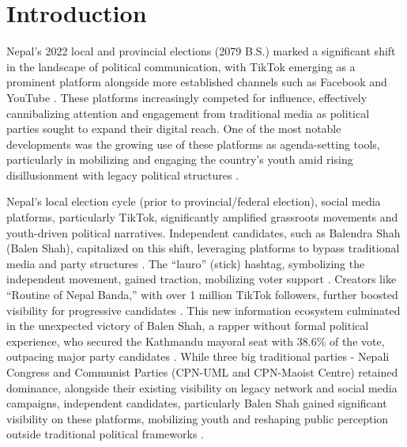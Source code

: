 \documentclass[12pt,a4paper]{report}
\begin{document}
\chapter{Introduction}
Nepal’s 2022 local and provincial elections (2079 B.S.) marked a significant shift in the landscape of political communication, with TikTok emerging as a prominent platform alongside more established channels such as Facebook and YouTube \parencite{nepalitimes2025}. These platforms increasingly competed for influence, effectively cannibalizing attention and engagement from traditional media as political parties sought to expand their digital reach. One of the most notable developments was the growing use of these platforms as agenda-setting tools, particularly in mobilizing and engaging the country’s youth amid rising disillusionment with legacy political structures \parencite{FPExplainers2024, dahal2023influence}.

Nepal's local election cycle (prior to provincial/federal election), social media platforms, particularly TikTok, significantly amplified grassroots movements and youth-driven political narratives. Independent candidates, such as Balendra Shah (Balen Shah), capitalized on this shift, leveraging platforms to bypass traditional media and party structures \parencite{DW2022NepalElections}. The ``lauro'' (stick) hashtag, symbolizing the independent movement, gained traction, mobilizing voter support \parencite{AnnapurnaExpress2022}. Creators like ``Routine of Nepal Banda,'' with over 1 million TikTok followers, further boosted visibility for progressive candidates \parencite{dahal2023influence}. This new information ecosystem culminated in the unexpected victory of Balen Shah, a rapper without formal political experience, who secured the Kathmandu mayoral seat with 38.6\% of the vote, outpacing major party candidates \parencite{wikipedia2022local}. While three big traditional parties - Nepali Congress and Communist Parties (CPN-UML and CPN-Maoist Centre) retained dominance, alongside their existing visibility on legacy network and social media campaigns, independent candidates, particularly  Balen Shah gained significant visibility on these platforms, mobilizing youth and reshaping public perception outside traditional political frameworks \parencite{DW2022NepalElections}.
\end{document}
